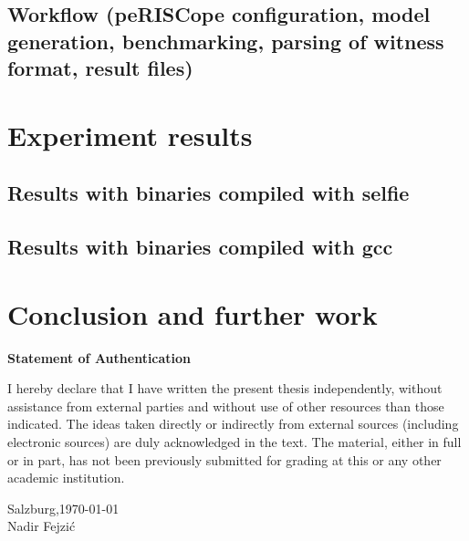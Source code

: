 \documentclass[12pt]{article}
\begin{document}
\subsection{Workflow (peRISCope configuration, model generation, benchmarking, parsing of witness format, result files)}


\section{Experiment results}

\subsection{Results with binaries compiled with selfie}

\subsection{Results with binaries compiled with gcc}


\section{Conclusion and further work}

\bigskip


\newpage

\printbibliography

\newpage

\vspace*{\fill}
\begin{center}
    \textbf{\Huge Statement of Authentication}\\
\end{center}

\vspace{1cm}

I hereby declare that I have written the present thesis independently, without
assistance from external parties and without use of other resources than those
indicated. The ideas taken directly or indirectly from external sources
(including electronic sources) are duly acknowledged in the text. The material,
either in full or in part, has not been previously submitted for grading at
this or any other academic institution.\\

\vspace{1cm}

Salzburg,\today \hspace{0.5cm}\hrulefill\\
\vspace{-0.5cm}
\flushright Nadir Fejzić

\vspace*{\fill}
\end{document}
